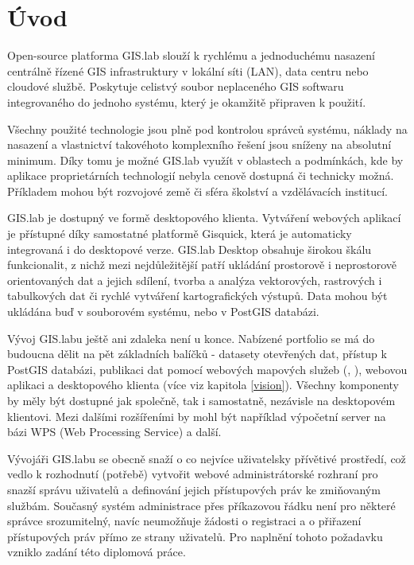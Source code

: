 \chapter*{Úvod}
\label{1-uvod}


Open-source platforma GIS.lab slouží k rychlému a jednoduchému
nasazení centrálně řízené GIS infrastruktury v lokální síti (LAN),
data centru nebo cloudové službě. Poskytuje celistvý soubor
neplaceného GIS softwaru integrovaného do jednoho systému, který je
okamžitě připraven k použití.

Všechny použité technologie jsou plně pod kontrolou správců systému, náklady
na nasazení a vlastnictví takovéhoto komplexního řešení jsou sníženy
na absolutní minimum. Díky tomu je možné GIS.lab využít v oblastech a
podmínkách, kde by aplikace proprietárních technologií nebyla cenově dostupná či
technicky možná. Příkladem mohou být rozvojové země či sféra školství a vzdělávacích institucí.

GIS.lab je dostupný ve formě desktopového klienta. Vytváření webových aplikací je přístupné díky samostatné platformě Gisquick, která je automaticky integrovaná i do desktopové verze. GIS.lab
Desktop obsahuje širokou škálu funkcionalit, z nichž mezi nejdůležitější
patří ukládání prostorově i neprostorově orientovaných dat a jejich
sdílení, tvorba a analýza vektorových, rastrových i tabulkových dat
či rychlé vytváření kartografických výstupů. Data mohou být ukládána buď v souborovém systému, nebo v PostGIS databázi.

Vývoj GIS.labu ještě ani zdaleka není u konce. Nabízené portfolio se
má do budoucna dělit na pět základních balíčků - datasety otevřených dat, přístup k PostGIS
databázi, publikaci dat pomocí webových mapových služeb (,
), webovou aplikaci a desktopového klienta (více viz kapitola
\ref{vision}). Všechny komponenty by měly být dostupné jak společně, tak i samostatně, nezávisle na desktopovém klientovi. Mezi dalšími rozšířeními by mohl být například výpočetní server na bázi WPS (Web Processing Service) a další.

Vývojáři GIS.labu se obecně snaží o co nejvíce uživatelsky přívětivé
prostředí, což vedlo k rozhodnutí (potřebě) vytvořit webové
administrátorské rozhraní pro snazší správu uživatelů a definování
jejich přístupových práv ke zmiňovaným službám. Současný systém
administrace přes příkazovou řádku není pro některé správce
srozumitelný, navíc neumožňuje žádosti o registraci a o přiřazení
přístupových práv přímo ze strany uživatelů. Pro naplnění tohoto
požadavku vzniklo zadání této diplomová práce.

